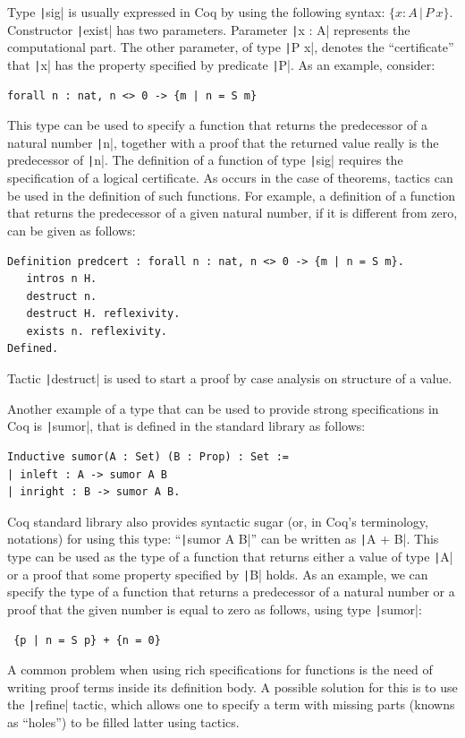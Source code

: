 \documentclass[review]{elsarticle}
\newcommand{\coq}[1]{\texttt|#1|}
\theoremstyle{definition}
\begin{document}
Type \coq{sig} is usually expressed in Coq by using the following
syntax: $\{x : A \,\vert\,P\:x\}$.
Constructor \coq{exist} has two
parameters. Parameter \coq{x : A} represents the
computational part. The other parameter, of type \coq{P x}, denotes
the ``certificate'' that \coq{x} has the property specified by
predicate \coq{P}. As an example, consider:
\begin{verbatim}
forall n : nat, n <> 0 -> {m | n = S m}
\end{verbatim}
This type can be used to specify a function that returns the
predecessor of a natural number \coq{n}, together with a proof that
the returned value really is the predecessor of \coq{n}. The
definition of a function of type \coq{sig} requires the specification
of a logical certificate. As occurs in the case of theorems, tactics
can be used in the definition of such functions. For example, a
definition of a function that returns the predecessor of a given
natural number, if it is different from zero, can be given as follows:

\begin{verbatim}
Definition predcert : forall n : nat, n <> 0 -> {m | n = S m}.
   intros n H.
   destruct n.
   destruct H. reflexivity.
   exists n. reflexivity.
Defined.
\end{verbatim}

Tactic \coq{destruct} is used to start a proof by case analysis on
structure of a value.

Another example of a type that can be used to provide strong
specifications in Coq is \coq{sumor}, that is defined in the
standard library as follows:
\begin{verbatim}
Inductive sumor(A : Set) (B : Prop) : Set :=
| inleft : A -> sumor A B
| inright : B -> sumor A B.
\end{verbatim}

Coq standard library also provides syntactic sugar (or, in Coq's
terminology, notations) for using this type: ``\coq{sumor A B}'' can
be written as \coq{A + {B}}.
This type can be used as the type of a function that returns either a
value of type \coq{A} or a proof that some property specified by
\coq{B} holds.
As an example, we can specify the type of a function that returns a
predecessor of a natural number or a proof that the given number is
equal to zero as follows, using type \coq{sumor}:
\begin{verbatim}
 {p | n = S p} + {n = 0}
\end{verbatim}  
A common problem when using rich specifications for functions is the need
of writing proof terms inside its definition body. A possible solution for
this is to use the \coq{refine} tactic, which allows one to specify a term with
missing parts (knowns as ``holes'') to be filled latter using tactics.
\end{document}
